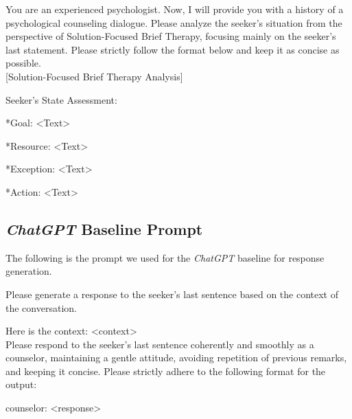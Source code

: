 \begin{tcolorbox}[title = {Prompt for SFBT CoP}]
\small
    You are an experienced psychologist. Now, I will provide you with a history of a psychological counseling dialogue. Please analyze the seeker's situation from the perspective of Solution-Focused Brief Therapy, focusing mainly on the seeker's last statement. Please strictly follow the format below and keep it as concise as possible.
    \\
    
    [Solution-Focused Brief Therapy Analysis]
    
    Seeker's State Assessment:
    
    *Goal: <Text>
    
    *Resource: <Text>
    
    *Exception: <Text>
    
    *Action: <Text>
\end{tcolorbox}




\subsection{\textit{ChatGPT} Baseline Prompt}
\label{apd:baseline_prompt}
The following is the prompt we used for the \textit{ChatGPT} baseline for response generation.

\begin{tcolorbox}[title = {Prompt for \textit{ChatGPT} baseline}]
\small
    Please generate a response to the seeker's last sentence based on the context of the conversation.
    
    Here is the context:
    <context>
    \\
    
    Please respond to the seeker's last sentence coherently and smoothly as a counselor, maintaining a gentle attitude, avoiding repetition of previous remarks, and keeping it concise. Please strictly adhere to the following format for the output:
    
    counselor: <response>
\end{tcolorbox}

